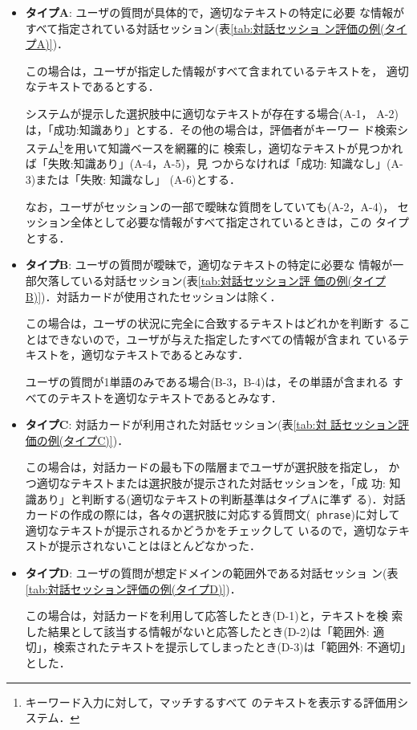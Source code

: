 \begin{itemize}
 \item {\bf タイプA}: ユーザの質問が具体的で，適切なテキストの特定に必要
       な情報がすべて指定されている対話セッション(表\ref{tab:対話セッショ
       ン評価の例(タイプA)})．

       この場合は，ユーザが指定した情報がすべて含まれているテキストを，
       適切なテキストであるとする．

       システムが提示した選択肢中に適切なテキストが存在する場合(A-1，
       A-2)は，「成功:知識あり」とする．その他の場合は，評価者がキーワー
       ド検索システム\footnote{キーワード入力に対して，マッチするすべて
       のテキストを表示する評価用システム．}を用いて知識ベースを網羅的に
       検索し，適切なテキストが見つかれば「失敗:知識あり」(A-4，A-5)，見
       つからなければ「成功: 知識なし」(A-3)または「失敗: 知識なし」
       (A-6)とする．

       なお，ユーザがセッションの一部で曖昧な質問をしていても(A-2，A-4)，
       セッション全体として必要な情報がすべて指定されているときは，この
       タイプとする．

 \item {\bf タイプB}: ユーザの質問が曖昧で，適切なテキストの特定に必要な
       情報が一部欠落している対話セッション(表\ref{tab:対話セッション評
       価の例(タイプB)})．対話カードが使用されたセッションは除く．

       この場合は，ユーザの状況に完全に合致するテキストはどれかを判断す
       ることはできないので，ユーザが与えた指定したすべての情報が含まれ
       ているテキストを，適切なテキストであるとみなす．
       
       ユーザの質問が1単語のみである場合(B-3，B-4)は，その単語が含まれる
       すべてのテキストを適切なテキストであるとみなす．

 \item {\bf タイプC}: 対話カードが利用された対話セッション(表\ref{tab:対
       話セッション評価の例(タイプC)})．

       この場合は，対話カードの最も下の階層までユーザが選択肢を指定し，
       かつ適切なテキストまたは選択肢が提示された対話セッションを，「成
       功: 知識あり」と判断する(適切なテキストの判断基準はタイプAに準ず
       る)．対話カードの作成の際には，各々の選択肢に対応する質問文({\tt
       phrase})に対して適切なテキストが提示されるかどうかをチェックして
       いるので，適切なテキストが提示されないことはほとんどなかった．

 \item {\bf タイプD}: ユーザの質問が想定ドメインの範囲外である対話セッショ
       ン(表\ref{tab:対話セッション評価の例(タイプD)})．

       この場合は，対話カードを利用して応答したとき(D-1)と，テキストを検
       索した結果として該当する情報がないと応答したとき(D-2)は「範囲外: 
       適切」，検索されたテキストを提示してしまったとき(D-3)は「範囲外: 
       不適切」とした．

\end{itemize}

